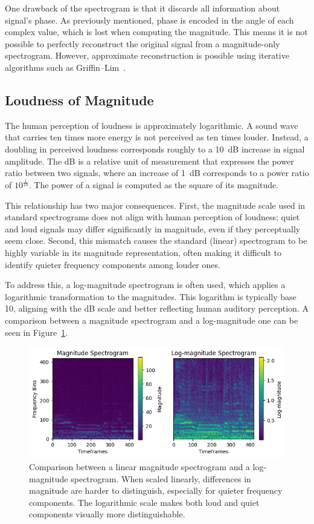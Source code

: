 One drawback of the spectrogram is that it discards all information about signal's phase. As previously mentioned, phase is encoded in the angle of each complex value, which is lost when computing the magnitude. This means it is not possible to perfectly reconstruct the original signal from a magnitude-only spectrogram. However, approximate reconstruction is possible using iterative algorithms such as Griffin–Lim~\cite{1164317}.

\subsection{Loudness of Magnitude}

The human perception of loudness is approximately logarithmic. A sound wave that carries ten times more energy is not perceived as ten times louder. Instead, a doubling in perceived loudness corresponds roughly to a 10~\gls{dB} increase in signal amplitude. The \acrlong{dB} is a relative unit of measurement that expresses the power ratio between two signals, where an increase of 1~\gls{dB} corresponds to a power ratio of $10^\frac{1}{10}$. The power of a signal is computed as the square of its magnitude. 

This relationship has two major consequences. First, the magnitude scale used in standard spectrograms does not align with human perception of loudness; quiet and loud signals may differ significantly in magnitude, even if they perceptually seem close. Second, this mismatch causes the standard (linear) spectrogram to be highly variable in its magnitude representation, often making it difficult to identify quieter frequency components among louder ones.

To address this, a log-magnitude spectrogram is often used, which applies a logarithmic transformation to the magnitudes. This logarithm is typically base 10, aligning with the \acrlong{dB} scale and better reflecting human auditory perception. A comparison between a magnitude spectrogram and a log-magnitude one can be seen in Figure~\ref{SpectrogramLogspectrogramFigure}.

\begin{figure}[H]
    \centering
    \hspace*{-1.0cm}
    \includegraphics[scale=1.0]{figures/spectrogramlogspectrogram}
    \caption{Comparison between a linear magnitude spectrogram and a log-magnitude spectrogram. When scaled linearly, differences in magnitude are harder to distinguish, especially for quieter frequency components. The logarithmic scale makes both loud and quiet components visually more distinguishable.}
    \label{SpectrogramLogspectrogramFigure}
\end{figure}

